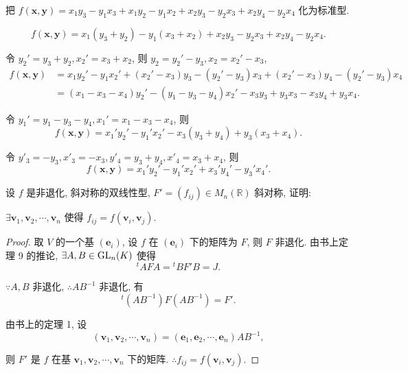 \documentclass[color=black,device=normal,lang=cn,mode=geye]{elegantnote}
\begin{document}
\begin{exercisec}%
    把 $f(\boldsymbol{x},\boldsymbol{y})=x_1y_3-y_1x_3+x_1y_2-y_1x_2+x_2y_3-y_2x_3+x_2y_4-y_2x_4$ 化为标准型.
\end{exercisec}
\begin{solution}
    \[f(\boldsymbol{x},\boldsymbol{y})=x_1(y_3+y_2)-y_1(x_3+x_2)+x_2y_3-y_2x_3+x_2y_4-y_2x_4.\]

    令 $y_2'=y_3+y_2,x_2'=x_3+x_2$, 则 $y_2=y_2'-y_3,x_2=x_2'-x_3$,
    \begin{align*}
        f(\boldsymbol{x},\boldsymbol{y}) & =x_1y_2'-y_1x_2'+(x_2'-x_3)y_3-(y_2'-y_3)x_3+(x_2'-x_3)y_4-(y_2'-y_3)x_4 \\
        & =(x_1-x_3-x_4)y_2'-(y_1-y_3-y_4)x_2'-x_3y_3+y_3x_3-x_3y_4+y_3x_4.
    \end{align*}

    令 $y_1'=y_1-y_3-y_4,x_1'=x_1-x_3-x_4$, 则
    \[f(\boldsymbol{x},\boldsymbol{y})=x_1'y_2'-y_1'x_2'-x_3(y_3+y_4)+y_3(x_3+x_4).\]

    令 $y'_3=-y_3,x'_3=-x_3,y'_4=y_3+y_4,x'_4=x_3+x_4$, 则
    \[f(\boldsymbol{x},\boldsymbol{y})=x_1'y_2'-y_1'x_2'+x_3'y_4'-y_3'x_4'.\]
\end{solution}
\begin{exercisec}%
    设 $f$ 是非退化, 斜对称的双线性型, $F'=(f_{ij})\in M_n(\mathbb{R})$ 斜对称, 证明:
    
    $\exists\boldsymbol{v}_1,\boldsymbol{v}_2,\cdots,\boldsymbol{v}_n$ 使得 $f_{ij}=f(\boldsymbol{v}_i,\boldsymbol{v}_j)$.
\end{exercisec}
\begin{proof}
    取 $V$ 的一个基 $(\boldsymbol{e}_i)$, 设 $f$ 在 $(\boldsymbol{e}_i)$ 下的矩阵为 $F$, 则 $F$ 非退化. 由书上定理 9 的推论, $\exists A,B\in\operatorname{GL} _n(K)$ 使得
    \[{}^tAFA={}^tBF'B=J.\]

    $\because A,B$ 非退化, $\therefore AB^{-1}$ 非退化, 有
    \[{}^t(AB^{-1})F(AB^{-1})=F'.\]

    由书上的定理 1, 设
    \[(\boldsymbol{v}_1,\boldsymbol{v}_2,\cdots,\boldsymbol{v}_n)=(\boldsymbol{e}_1,\boldsymbol{e}_2,\cdots,\boldsymbol{e}_n)AB^{-1},\]

    则 $F'$ 是 $f$ 在基 $\boldsymbol{v}_1,\boldsymbol{v}_2,\cdots,\boldsymbol{v}_n$ 下的矩阵. $\therefore f_{ij}=f(\boldsymbol{v}_i,\boldsymbol{v}_j)$.
\end{proof}
\end{document}
